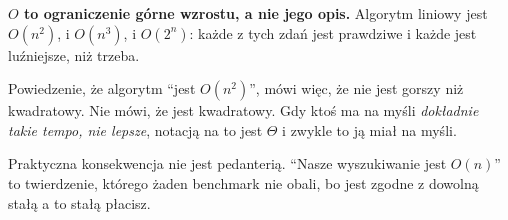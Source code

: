 \begin{fr}
\begin{trapbox}
\textbf{$O$ to ograniczenie górne wzrostu, a nie jego opis.} Algorytm liniowy
jest $O(n^{2})$, i $O(n^{3})$, i $O(2^{n})$: każde z tych zdań jest prawdziwe i
każde jest luźniejsze, niż trzeba.

Powiedzenie, że algorytm \enquote{jest $O(n^{2})$}, mówi więc, że nie jest
gorszy niż kwadratowy. Nie mówi, że jest kwadratowy. Gdy ktoś ma na myśli
\emph{dokładnie takie tempo, nie lepsze}, notacją na to jest $\Theta$ i zwykle
to ją miał na myśli.

Praktyczna konsekwencja nie jest pedanterią. \enquote{Nasze wyszukiwanie jest
$O(n)$} to twierdzenie, którego żaden benchmark nie obali, bo jest zgodne z
dowolną stałą \dash{} a to stałą płacisz.
\end{trapbox}
\end{fr}

